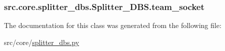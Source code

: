 \subsubsection[{team\+\_\+socket}]{\setlength{\rightskip}{0pt plus 5cm}src.\+core.\+splitter\+\_\+dbs.\+Splitter\+\_\+\+D\+B\+S.\+team\+\_\+socket}\label{classsrc_1_1core_1_1splitter__dbs_1_1Splitter__DBS_acd50eb2fee3c9691cd631f4eb293d581}


The documentation for this class was generated from the following file\+:\begin{DoxyCompactItemize}
\item 
src/core/\hyperlink{splitter__dbs_8py}{splitter\+\_\+dbs.\+py}\end{DoxyCompactItemize}
